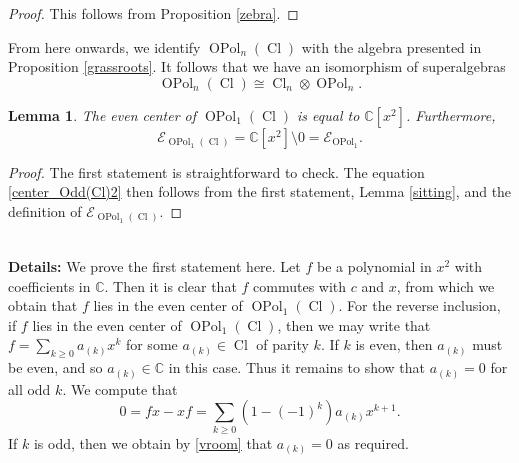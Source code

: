\documentclass[11pt]{amsart}
\newcommand{\details}[1]{
      \ \\
      {\color{OliveGreen}
        \textbf{Details:} #1
      }
      \\
  }
\newcommand{\details}[1]{}
\newtheorem{lem}[theo]{Lemma}
\theoremstyle{definition}
\numberwithin{equation}{section}
\begin{document}
\begin{proof}
This follows from Proposition \ref{zebra}.
\end{proof}

From here onwards, we identify $ \operatorname{OPol}_{n}(\operatorname{Cl}) $ with the algebra presented in Proposition \ref{grassroots}. It follows that we have an isomorphism of superalgebras
\begin{equation}
\operatorname{OPol}_{n}(\operatorname{Cl}) \cong \operatorname{Cl}_{n} \otimes \operatorname{OPol}_{n}.
\end{equation}



\begin{lem} \label{center_Odd(Cl)}
The even center of $ \operatorname{OPol}_{1}(\operatorname{Cl}) $ is equal to $ \mathbb{C}[x^{2}] $. Furthermore, 
\begin{equation} \label{center_Odd(Cl)2}
\mathcal{E}_{\operatorname{OPol}_{1}(\operatorname{Cl})} = \mathbb{C}[x^{2}] \setminus 0 = \mathcal{E}_{\operatorname{OPol}_{1}}.
\end{equation}
\end{lem}

\begin{proof}
The first statement is straightforward to check. The equation \cref{center_Odd(Cl)2} then follows from the first statement, Lemma \ref{sitting}, and the definition of $ \mathcal{E}_{\operatorname{OPol}_{1}(\operatorname{Cl})} $.
\end{proof}

\details{We prove the first statement here. Let $ f $ be a polynomial in $ x^{2} $ with coefficients in $ \mathbb{C} $. Then it is clear that \(f\) commutes with $ c $ and $ x $, from which we obtain that \(f\) lies in the even center of $ \operatorname{OPol}_{1}(\operatorname{Cl}) $. For the reverse inclusion, if \(f\) lies in the even center of $ \operatorname{OPol}_{1}(\operatorname{Cl}) $, then we may write that $ f = \sum_{k\geq 0} a_{(k)}x^{k} $ for some $ a_{(k)} \in \operatorname{Cl} $ of parity $ k $. If \(k\) is even, then $ a_{(k)} $ must be even, and so $ a_{(k)} \in \mathbb{C} $ in this case. Thus it remains to show that $ a_{(k)} = 0 $ for all odd $ k $. We compute that
\begin{equation} \label{vroom}
0 = fx-xf = \sum_{k\geq 0} (1-(-1)^{k})a_{(k)}x^{k+1}.
\end{equation}
If $ k $ is odd, then we obtain by \cref{vroom} that $ a_{(k)} = 0 $ as required.}
\end{document}
